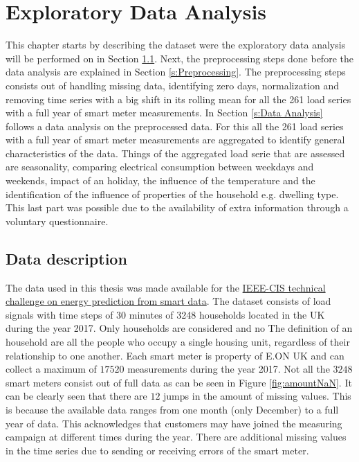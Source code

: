 \chapter{Exploratory Data Analysis}
\label{cha:Data analysis}
This chapter starts by describing the dataset were the exploratory data analysis will be performed on in Section \ref{s:Data description}. Next, the preprocessing steps done before the data analysis are explained in Section \ref{s:Preprocessing}. The preprocessing steps consists out of handling missing data, identifying zero days, normalization and removing time series with a big shift in its rolling mean for all the 261 load series with a full year of smart meter measurements. In Section \ref{s:Data Analysis} follows a data analysis on the preprocessed data. For this all the 261 load series with a full year of smart meter measurements are aggregated to identify general characteristics of the data. Things of the aggregated load serie that are assessed are seasonality, comparing electrical consumption between weekdays and weekends, impact of an holiday, the influence of the temperature and the identification of the influence of properties of the household e.g. dwelling type. This last part was possible due to the availability of extra information through a voluntary questionnaire.


\section{Data description}\label{s:Data description}
The data used in this thesis was made available for the \href{https://ieee-dataport.org/competitions/ieee-cis-technical-challenge-energy-prediction-smart-meter-data}{IEEE-CIS technical challenge on energy prediction from smart data}. The dataset consists of load signals with time steps of 30 minutes of 3248 households located in the UK during the year 2017. Only households are considered and no The definition of an household are all the people who occupy a single housing unit, regardless of their relationship to one another. Each smart meter is property of E.ON UK and can collect a maximum  of $17520$ measurements during the year 2017.
 Not all the $3248$ smart meters consist out of full data as can be seen in Figure \ref{fig:amountNaN}. It can be clearly seen that there are $12$ jumps in the amount of missing values. This is because the available data ranges from one month (only December) to a full year of data. This acknowledges that customers may have joined the measuring campaign at different times during the year. There are additional missing values in the time series due to sending or receiving errors of the smart meter.\\
 
